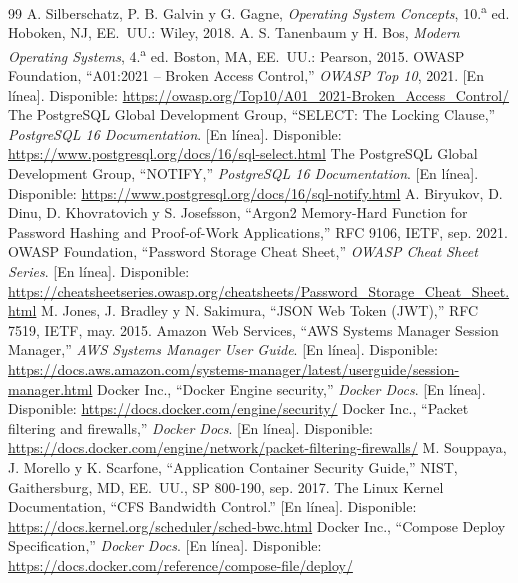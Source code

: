 \documentclass[conference,a4paper]{IEEEtran}
\begin{document}
\begin{thebibliography}{99}
 A. Silberschatz, P. B. Galvin y G. Gagne, \textit{Operating System Concepts}, 10.\textsuperscript{a} ed. Hoboken, NJ, EE.~UU.: Wiley, 2018.
 A. S. Tanenbaum y H. Bos, \textit{Modern Operating Systems}, 4.\textsuperscript{a} ed. Boston, MA, EE.~UU.: Pearson, 2015.
 OWASP Foundation, ``A01:2021 -- Broken Access Control,'' \textit{OWASP Top 10}, 2021. [En línea]. Disponible: \url{https://owasp.org/Top10/A01_2021-Broken_Access_Control/}
 The PostgreSQL Global Development Group, ``SELECT: The Locking Clause,'' \textit{PostgreSQL 16 Documentation}. [En línea]. Disponible: \url{https://www.postgresql.org/docs/16/sql-select.html}
 The PostgreSQL Global Development Group, ``NOTIFY,'' \textit{PostgreSQL 16 Documentation}. [En línea]. Disponible: \url{https://www.postgresql.org/docs/16/sql-notify.html}
 A. Biryukov, D. Dinu, D. Khovratovich y S. Josefsson, ``Argon2 Memory-Hard Function for Password Hashing and Proof-of-Work Applications,'' RFC 9106, IETF, sep. 2021.
 OWASP Foundation, ``Password Storage Cheat Sheet,'' \textit{OWASP Cheat Sheet Series}. [En línea]. Disponible: \url{https://cheatsheetseries.owasp.org/cheatsheets/Password_Storage_Cheat_Sheet.html}
 M. Jones, J. Bradley y N. Sakimura, ``JSON Web Token (JWT),'' RFC 7519, IETF, may. 2015.
 Amazon Web Services, ``AWS Systems Manager Session Manager,'' \textit{AWS Systems Manager User Guide}. [En línea]. Disponible: \url{https://docs.aws.amazon.com/systems-manager/latest/userguide/session-manager.html}
 Docker Inc., ``Docker Engine security,'' \textit{Docker Docs}. [En línea]. Disponible: \url{https://docs.docker.com/engine/security/}
 Docker Inc., ``Packet filtering and firewalls,'' \textit{Docker Docs}. [En línea]. Disponible: \url{https://docs.docker.com/engine/network/packet-filtering-firewalls/}
 M. Souppaya, J. Morello y K. Scarfone, ``Application Container Security Guide,'' NIST, Gaithersburg, MD, EE.~UU., SP 800-190, sep. 2017.
 The Linux Kernel Documentation, ``CFS Bandwidth Control.'' [En línea]. Disponible: \url{https://docs.kernel.org/scheduler/sched-bwc.html}
 Docker Inc., ``Compose Deploy Specification,'' \textit{Docker Docs}. [En línea]. Disponible: \url{https://docs.docker.com/reference/compose-file/deploy/}

\end{thebibliography}
\end{document}
